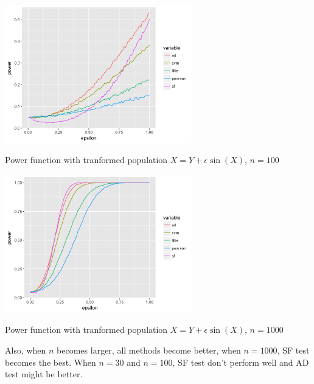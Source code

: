 \documentclass[twoside]{article}
\begin{document}
\begin{center}
\makeatletter
\def\@captype{figure}
\makeatother
\includegraphics [height=6cm]{code/noise.100.png}
\caption{Power function with tranformed population $X=Y+\epsilon\sin(X)$, $n=100$}
\label{i.pf100}
\end{center}

\begin{center}
\makeatletter
\def\@captype{figure}
\makeatother
\includegraphics [height=6cm]{code/noise.1000.png}
\caption{Power function with tranformed population $X=Y+\epsilon\sin(X)$, $n=1000$}
\label{i.pf1000}
\end{center}

Also, when $n$ becomes larger, all methods become better, when $n=1000$, SF test becomes the best. When $n=30$ and $n=100$, SF test don't perform well and AD test might be better.
\end{document}
